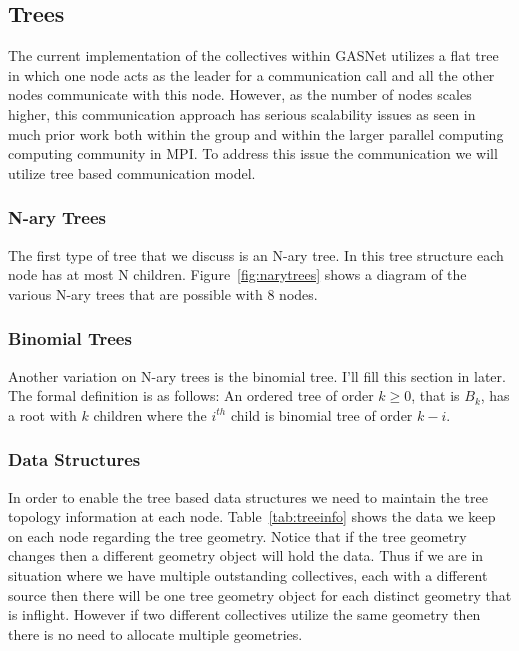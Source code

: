\documentclass[times,10pt]{article}
\begin{document}
\subsection{Trees}
The current implementation of the collectives within GASNet utilizes a flat tree in which one node acts as the leader for a communication call and all the other nodes communicate with this node. However, as the number of nodes scales higher, this communication approach has serious scalability issues as seen in much prior work both within the group and within the larger parallel computing computing community in MPI. To address this issue the communication we will utilize tree based communication model.

\subsubsection{N-ary Trees}
The first type of tree that we discuss is an N-ary tree. In this tree structure each node has at most N children. Figure~\ref{fig:narytrees} shows a diagram of the various N-ary trees that are possible with 8 nodes.

\subsubsection{Binomial Trees}
Another variation on N-ary trees is the binomial tree.  I'll fill this section in later. The formal definition is as follows:
An ordered tree of order $k \geq 0$, that is $B_k$, has a root with $k$ children where the $i^{th}$ child is binomial tree of order $k-i$.

\subsubsection{Data Structures}
In order to enable the tree based data structures we need to maintain the tree topology information at each node. 
Table~\ref{tab:treeinfo} shows the data we keep on each node regarding the tree geometry. Notice that if the tree geometry changes then a different geometry object will hold the data. Thus if we are in situation where we have multiple outstanding collectives, each with a different source then there will be one tree geometry object for each distinct geometry that is inflight. However if two different collectives utilize the same geometry then there is no need to allocate multiple geometries.
\end{document}
